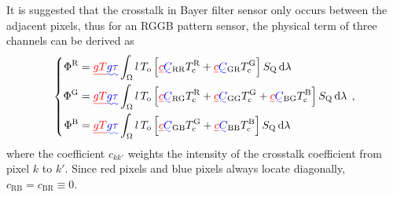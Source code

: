\documentclass[9pt,twocolumn,twoside]{osajnl}
\newcommand{\D}{\mathrm{d}}
\providecommand{\DIFadd}[1]{{\protect\color{blue}\uwave{#1}}} %
\providecommand{\DIFdel}[1]{{\protect\color{red}\sout{#1}}}                      %
\providecommand{\DIFaddbegin}{} %
\providecommand{\DIFaddend}{} %
\providecommand{\DIFdelbegin}{} %
\providecommand{\DIFdelend}{} %
\begin{document}
It is suggested that the crosstalk in Bayer filter sensor only occurs between the adjacent pixels\DIFaddbegin \DIFadd{~\mbox{%
\cite{Getman:07}}%
}\DIFaddend , thus for an RGGB pattern sensor, the physical term of three channels can be derived as
\begin{equation}
\left\{\begin{aligned}
\Phi^\text{R} &= \DIFdelbegin \DIFdel{gT}\DIFdelend \DIFaddbegin \DIFadd{g\tau}\DIFaddend \int_\Omega{}l\,T_\text{o}\left[\DIFdelbegin \DIFdel{c}\DIFdelend \DIFaddbegin \DIFadd{C}\DIFaddend _\text{RR}T_\text{c}^\text{R}+\DIFdelbegin \DIFdel{c}\DIFdelend \DIFaddbegin \DIFadd{C}\DIFaddend _\text{GR}T_\text{c}^\text{G}\right]S_\text{Q}\,\D{\lambda} \\
\Phi^\text{G} &= \DIFdelbegin \DIFdel{gT}\DIFdelend \DIFaddbegin \DIFadd{g\tau}\DIFaddend \int_\Omega{}l\,T_\text{o}\left[\DIFdelbegin \DIFdel{c}\DIFdelend \DIFaddbegin \DIFadd{C}\DIFaddend _\text{RG}T_\text{c}^\text{R}+\DIFdelbegin \DIFdel{c}\DIFdelend \DIFaddbegin \DIFadd{C}\DIFaddend _\text{GG}T_\text{c}^\text{G}+\DIFdelbegin \DIFdel{c}\DIFdelend \DIFaddbegin \DIFadd{C}\DIFaddend _\text{BG}T_\text{c}^\text{B}\right]S_\text{Q}\,\D{\lambda} \\
\Phi^\text{B} &= \DIFdelbegin \DIFdel{gT}\DIFdelend \DIFaddbegin \DIFadd{g\tau}\DIFaddend \int_\Omega{}l\,T_\text{o}\left[\DIFdelbegin \DIFdel{c}\DIFdelend \DIFaddbegin \DIFadd{C}\DIFaddend _\text{GB}T_\text{c}^\text{G}+\DIFdelbegin \DIFdel{c}\DIFdelend \DIFaddbegin \DIFadd{C}\DIFaddend _\text{BB}T_\text{c}^\text{B}\right]S_\text{Q}\,\D{\lambda}
\end{aligned}\right.\,,
\label{eq:7}
\end{equation}
where the coefficient $c_{kk'}$ weights the intensity of the crosstalk coefficient from pixel $k$ to $k'$. Since red pixels and blue pixels always locate diagonally, $c_\text{RB} = c_\text{BR}\equiv0$.
\end{document}
